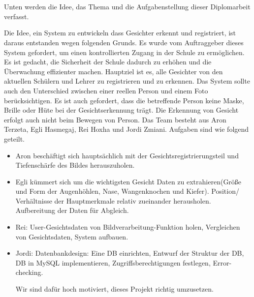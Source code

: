 \chapter{\docname}
\label{\docname}

\color{black}
Unten werden die Idee, das Thema und die Aufgabenstellung dieser Diplomarbeit verfasst.
\begin{flushleft}
	Die Idee, ein System zu entwickeln dass Gesichter erkennt und registriert, ist daraus entstanden wegen folgenden Grunds. 
	Es wurde vom Auftraggeber dieses System gefordert, um einen kontrollierten Zugang in der Schule zu ermöglichen. Es ist gedacht, die Sicherheit der Schule dadurch zu erhöhen und die Überwachung effizienter machen. 
	Hauptziel ist es, alle Gesichter von den aktuellen Schülern und Lehrer zu registrieren und zu erkennen. 
	Das System sollte auch den Unterschied zwischen einer reellen Person und einem Foto berücksichtigen.  Es ist auch gefordert, dass die betreffende Person keine Maske, Brille oder Hüte bei der Gesichtserkennung trägt. Die Erkennung von Gesicht erfolgt auch nicht beim Bewegen von Person.
	Das Team besteht aus Aron Terzeta, Egli Hasmegaj, Rei Hoxha und Jordi Zmiani. 
	Aufgaben sind wie folgend geteilt. 
\end{flushleft}
\begin{itemize}
	
	
	
	\item Aron beschäftigt sich hauptsächlich mit der Gesichtsregistrierungsteil und Tiefenschärfe des Bildes herauszuholen. 
	\item Egli kümmert sich um die wichtigsten Gesicht Daten zu extrahieren(Größe und Form der Augenhöhlen, Nase, Wangenknochen und Kiefer). Position/ Verhältnisse der Hauptmerkmale relativ zueinander herausholen.  Aufbereitung der Daten für Abgleich.
	\item Rei: User-Gesichtsdaten von Bildverarbeitung-Funktion holen, Vergleichen von Gesichtsdaten, System aufbauen.
	\item Jordi: Datenbankdesign: Eine DB einrichten, Entwurf der Struktur der DB, DB in MySQL implementieren, Zugriffsberechtigungen festlegen, Error-checking. 
	
	
	Wir sind dafür hoch motiviert, dieses Projekt richtig umzusetzen.
	
\end{itemize}
